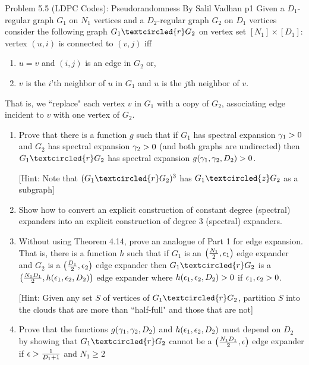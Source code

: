 \documentclass[a4paper, 11pt]{article}
\begin{document}
\begin{problem}{%
		Problem 5.5 (LDPC Codes): Pseudorandomness By Salil Vadhan
	}{p1%
	}
	Given a $D_1$-regular graph $G_1$ on $N_1$ vertices and a $D_2$-regular graph $G_2$ on $D_1$ vertices consider the following graph $G_1\textcircled{r}G_2$ on vertex set $[N_1]\times [D_1]$: vertex $(u,i)$ is connected to $(v,j)$ iff \begin{enumerate}[label=(\alph*)]
		\item $u=v$ and $(i,j)$ is an edge in $G_2$ or,
		\item $v$ is the $i$'th neighbor of $u$ in $G_1$ and $u$ is the $j$th neighbor of $v$. 
	\end{enumerate}
	That is, we ``replace" each vertex $v$ in $G_1$ with a copy of $G_2$, associating edge incident to $v$ with one vertex of $G_2$.
	\begin{enumerate}
		\item Prove that there is a function $g$ such that if $G_1$ has spectral expansion $\gamma_1>0$ and $G_2$ has spectral expansion $\gamma_2>0$ (and both graphs are undirected) then $G_1\textcircled{r}G_2$ has spectral expansion $g(\gamma_1,\gamma_2,D_2)>0$.
		
		[Hint: Note that $(G_1\textcircled{r}G_2)^3$ has $G_1\textcircled{z}G_2$ as a subgraph]
		\item Show how to convert an explicit construction of constant degree (spectral) expanders into an explicit construction of degree 3 (spectral) expanders.
		\item Without using Theorem 4.14, prove an analogue of Part 1 for edge expansion. That is, there is a function $h$ such that if $G_1$ is an $\left(\frac{N_1}2,\epsilon_1\right)$ edge expander and $G_2$ is a $\left(\frac{D_1}2,\epsilon_2\right)$ edge expander then $G_1\textcircled{r}G_2$ is a $\left(\frac{N_1D_1}{2},h(\epsilon_1,\epsilon_2,D_2)\right)$ edge expander where $h(\epsilon_1,\epsilon_2,D_2)>0$ if $\epsilon_1,\epsilon_2>0$. 
		
		[Hint: Given any set $S$ of vertices of $G_1\textcircled{r}G_2$, partition $S$ into the clouds that are more than ``half-full" and those that are not]
		\item Prove that the functions $g(\gamma_1,\gamma_2,D_2)$ and $h(\epsilon_1,\epsilon_2,D_2)$ must depend on $D_2$ by showing that $G_1\textcircled{r}G_2$ cannot be a $\left(\frac{N_1D_1}2,\epsilon\right)$ edge expander if $\epsilon>\frac1{D_1+1}$ and $N_1\geq 2$
	\end{enumerate}
\end{problem}
\end{document}
